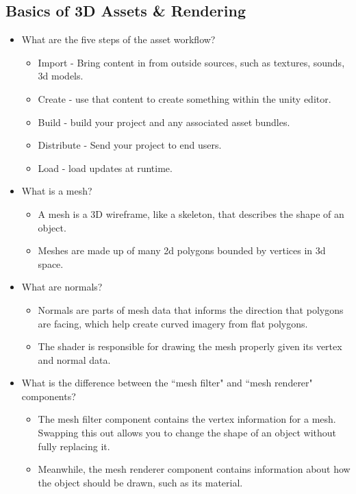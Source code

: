 \documentclass{article}
\begin{document}
\subsection{Basics of 3D Assets \& Rendering}
\begin{itemize}
    \item What are the five steps of the asset workflow?
    \begin{itemize}
        \item Import - Bring content in from outside sources, such as textures, sounds, 3d models.
        \item Create - use that content to create something within the unity editor.
        \item Build - build your project and any associated asset bundles.
        \item Distribute - Send your project to end users.
        \item Load - load updates at runtime.
    \end{itemize}
    \item What is a mesh?
    \begin{itemize}
        \item A mesh is a 3D wireframe, like a skeleton, that describes the shape of an object.
        \item Meshes are made up of many 2d polygons bounded by vertices in 3d space.
    \end{itemize}
    \item What are normals?
    \begin{itemize}
        \item Normals are parts of mesh data that informs the direction that polygons are facing, which help create curved imagery from flat polygons.
        \item The shader is responsible for drawing the mesh properly given its vertex and normal data.
    \end{itemize}
    \item What is the difference between the ``mesh filter" and ``mesh renderer" components?
    \begin{itemize}
        \item The mesh filter component contains the vertex information for a mesh. Swapping this out allows you to change the shape of an object without fully replacing it.
        \item Meanwhile, the mesh renderer component contains information about how the object should be drawn, such as its material.
    \end{itemize}

\end{itemize}
\end{document}
